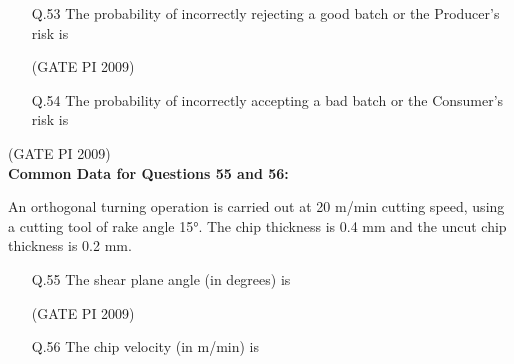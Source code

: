 \documentclass[journal,12pt,onecolumn]{IEEEtran}
\theoremstyle{remark}
\begin{document}
\begin{enumerate}[label=Q.\arabic*), leftmargin=*]
\setcounter{enumi}{52}

\item[Q.53] The probability of incorrectly rejecting a good batch or the Producer's risk is
\begin{enumerate}[label=(\Alph*)]
\end{enumerate}
\hfill (GATE PI 2009)
\item[Q.54] The probability of incorrectly accepting a bad batch or the Consumer's risk is
\begin{enumerate}[label=(\Alph*)]
\end{enumerate}
\end{enumerate}
\hfill (GATE PI 2009) \\
\textbf{Common Data for Questions 55 and 56:}

An orthogonal turning operation is carried out at 20 m/min cutting speed, using a cutting tool of rake angle 15°. The chip thickness is 0.4 mm and the uncut chip thickness is 0.2 mm.

\begin{enumerate}[label=Q.\arabic*, leftmargin=*]
\setcounter{enumi}{54}

\item[Q.55] The shear plane angle (in degrees) is
\begin{enumerate}[label=(\Alph*)]
\end{enumerate}
\hfill (GATE PI 2009)
\item[Q.56] The chip velocity (in m/min) is
\begin{enumerate}[label=(\Alph*)]
\end{enumerate}
\end{enumerate}
\end{document}
